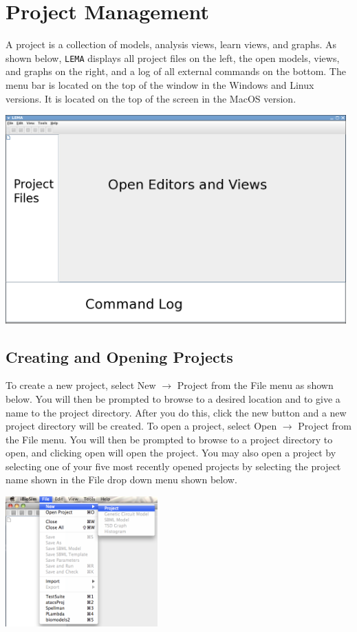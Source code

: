 \documentclass[titlepage,11pt]{article}
\begin{document}
\section{Project Management}

\noindent
A project is a collection of models, analysis views, learn
views, and graphs.  As shown below, {\tt LEMA} displays all project
files on the left, the open models, views, and graphs on the
right, and a log of all external commands on the bottom.
The menu bar is located on the top of the window in the Windows and
Linux versions.  It is located on the top of the screen in the MacOS version.
\begin{center}
\includegraphics[height=80mm]{screenshots/LEMA}
\end{center}

\subsection{Creating and Opening Projects}

\noindent
To create a new project, select New $\rightarrow$ Project from the File
menu as shown below. You will then be prompted to browse to a desired location
and to give a name to the project directory. After you do this,
click the new button and a new project directory will be created.
To open a project, select Open $\rightarrow$ Project from the File menu.
You will then be prompted to browse to a project directory to
open, and clicking open will open the project. You may also open
a project by selecting one of your five most recently opened
projects by selecting the project name shown in the File drop
down menu shown below. 
\begin{center}
\includegraphics[height=50mm]{screenshots/project}
\end{center}
\end{document}
